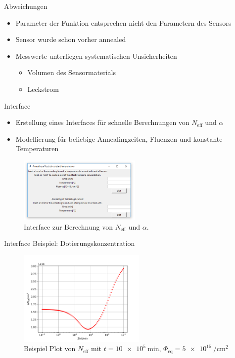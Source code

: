 \documentclass[aspectratio=1610, 9pt]{beamer}
\begin{document}
\begin{frame}{Abweichungen}
  \begin{itemize}
    \item Parameter der Funktion entsprechen nicht den Parametern des Sensors
    \medskip
    \item Sensor wurde schon vorher annealed
    \medskip
    \item Messwerte unterliegen systematischen Unsicherheiten
    \medskip
    \begin{itemize}
      \item Volumen des Sensormaterials
      \medskip
      \item Leckstrom
    \end{itemize}
  \end{itemize}
\end{frame}

\begin{frame}{Interface}
  \begin{itemize}
    \item Erstellung eines Interfaces für schnelle Berechnungen von $N_{\mathrm{eff}}$ und $\alpha$
    \item Modellierung für beliebige Annealingzeiten, Fluenzen und konstante Temperaturen
  \end{itemize}
  \begin{figure}
      \includegraphics[width=0.53\textwidth]{images/interface.PNG}
  \caption{Interface zur Berechnung von $N_{\mathrm{eff}}$ und $\alpha$.}
  \end{figure}
\end{frame}

\begin{frame}{Interface Beispiel: Dotierungskonzentration}
  \begin{figure}
    \includegraphics[width=0.55\textwidth]{images/interface_n_eff.PDF}
    \caption{Beispiel Plot von $N_{\mathrm{eff}}$ mit $t = \SI{10e5}{\minute}$, $\Phi_{\mathrm{eq}}= \SI{5e15}{\per\centi\meter\squared}$}
  \end{figure}
\end{frame}
\end{document}
